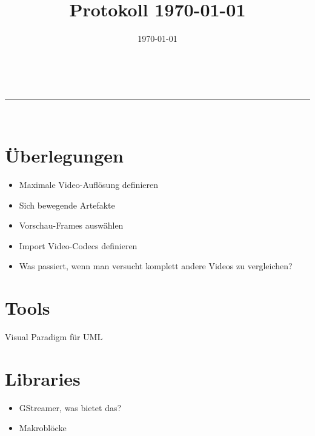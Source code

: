 \documentclass[parskip=full]{scrartcl}
\makeatletter
\newcommand{\linia}{\rule{\linewidth}{0.5pt}}
\theoremstyle{mytheor}
\renewcommand{\maketitle}{
\begin{center}
\vspace{2ex}
{\huge \textsc{\@title}}
\vspace{1ex}
\\
\linia\\
\@author \hfill \@date
\vspace{4ex}
\end{center}
}
\makeatother
\begin{document}
\title{Protokoll \today}
\date{\today}

\maketitle
\section{Überlegungen}
\begin{itemize}
\item Maximale Video-Auflösung definieren
\item Sich bewegende Artefakte
\item Vorschau-Frames auswählen
\item Import Video-Codecs definieren
\item Was passiert, wenn man versucht komplett andere Videos zu vergleichen?
\end{itemize}

\section{Tools}
Visual Paradigm für UML

\section{Libraries}
\begin{itemize}
\item GStreamer, was bietet das?
\item Makroblöcke
\end{itemize}
\end{document}
